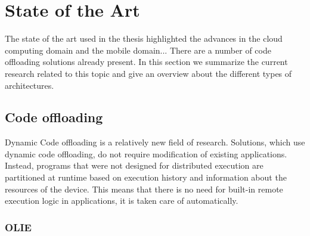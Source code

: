 
\chapter{State of the Art} %


The state of the art used in the thesis highlighted the advances in the cloud computing domain and the mobile domain...
There are a number of code offloading solutions already present. In this section we summarize the current research related to this topic and give an overview about the different types of architectures.


\ifpdf
    \graphicspath{{X/figures/PNG/}{X/figures/PDF/}{X/figures/}}
\else
    \graphicspath{{X/figures/EPS/}{X/figures/}}
\fi



\section{Code offloading}

Dynamic Code offloading is a relatively new field of research. Solutions, which use dynamic code offloading, do not require modification of existing applications. Instead, programs that were not designed for distributed execution are partitioned at runtime based on execution history and information about the resources of the device. This means that there is no need for built-in remote execution logic in applications, it is taken care of automatically.

\subsection{OLIE}

